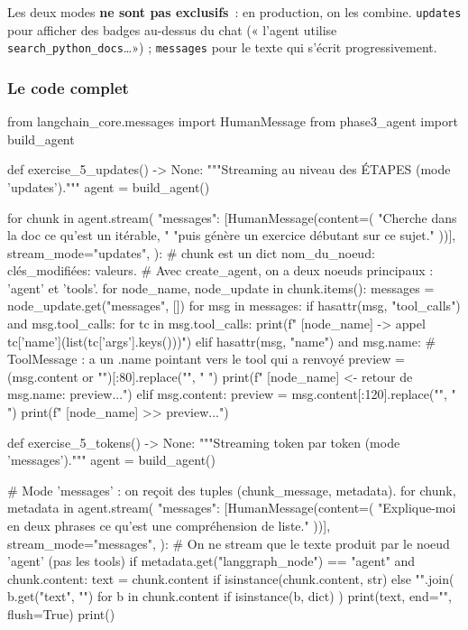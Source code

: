 \documentclass[11pt,a4paper]{article}
\begin{document}
Les deux modes \textbf{ne sont pas exclusifs}~: en production, on les
combine. \texttt{updates} pour afficher des badges au-dessus du chat
(« l'agent utilise \texttt{search\_python\_docs}\dots ») ;
\texttt{messages} pour le texte qui s'écrit progressivement.

\subsubsection{Le code complet}

\begin{pythoncode}
from langchain_core.messages import HumanMessage
from phase3_agent import build_agent


def exercise_5_updates() -> None:
    """Streaming au niveau des ÉTAPES (mode 'updates')."""
    agent = build_agent()

    for chunk in agent.stream(
        {"messages": [HumanMessage(content=(
            "Cherche dans la doc ce qu'est un itérable, "
            "puis génère un exercice débutant sur ce sujet."
        ))]},
        stream_mode="updates",
    ):
        # chunk est un dict {nom_du_noeud: {clés_modifiées: valeurs}}.
        # Avec create_agent, on a deux noeuds principaux : 'agent' et 'tools'.
        for node_name, node_update in chunk.items():
            messages = node_update.get("messages", [])
            for msg in messages:
                if hasattr(msg, "tool_calls") and msg.tool_calls:
                    for tc in msg.tool_calls:
                        print(f"  [{node_name}] -> appel {tc['name']}({list(tc['args'].keys())})")
                elif hasattr(msg, "name") and msg.name:
                    # ToolMessage : a un .name pointant vers le tool qui a renvoyé
                    preview = (msg.content or "")[:80].replace("\n", " ")
                    print(f"  [{node_name}] <- retour de {msg.name}: {preview}...")
                elif msg.content:
                    preview = msg.content[:120].replace("\n", " ")
                    print(f"  [{node_name}] >> {preview}...")


def exercise_5_tokens() -> None:
    """Streaming token par token (mode 'messages')."""
    agent = build_agent()

    # Mode 'messages' : on reçoit des tuples (chunk_message, metadata).
    for chunk, metadata in agent.stream(
        {"messages": [HumanMessage(content=(
            "Explique-moi en deux phrases ce qu'est une compréhension de liste."
        ))]},
        stream_mode="messages",
    ):
        # On ne stream que le texte produit par le noeud 'agent' (pas les tools)
        if metadata.get("langgraph_node") == "agent" and chunk.content:
            text = chunk.content if isinstance(chunk.content, str) else "".join(
                b.get("text", "") for b in chunk.content if isinstance(b, dict)
            )
            print(text, end="", flush=True)
    print()
\end{pythoncode}
\end{document}
